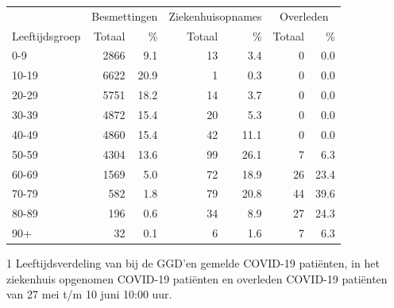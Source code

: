 \documentclass[
  english,
  man,floatsintext]{apa6}
\begin{document}
\begin{table}
\centering\begingroup\fontsize{11}{13}\selectfont

\begin{threeparttable}
\begin{tabular}{lrrrrrr}
\toprule
\multicolumn{1}{c}{ } & \multicolumn{2}{c}{Besmettingen} & \multicolumn{2}{c}{Ziekenhuisopnames} & \multicolumn{2}{c}{Overleden} \\
\cmidrule(l{3pt}r{3pt}){2-3} \cmidrule(l{3pt}r{3pt}){4-5} \cmidrule(l{3pt}r{3pt}){6-7}
Leeftijdsgroep & Totaal & \% & Totaal & \% & Totaal & \%\\
\midrule
0-9 & 2866 & 9.1 & 13 & 3.4 & 0 & 0.0\\
10-19 & 6622 & 20.9 & 1 & 0.3 & 0 & 0.0\\
20-29 & 5751 & 18.2 & 14 & 3.7 & 0 & 0.0\\
30-39 & 4872 & 15.4 & 20 & 5.3 & 0 & 0.0\\
40-49 & 4860 & 15.4 & 42 & 11.1 & 0 & 0.0\\
50-59 & 4304 & 13.6 & 99 & 26.1 & 7 & 6.3\\
60-69 & 1569 & 5.0 & 72 & 18.9 & 26 & 23.4\\
70-79 & 582 & 1.8 & 79 & 20.8 & 44 & 39.6\\
80-89 & 196 & 0.6 & 34 & 8.9 & 27 & 24.3\\
90+ & 32 & 0.1 & 6 & 1.6 & 7 & 6.3\\
\bottomrule
\end{tabular}
\begin{tablenotes}
\item[1] Leeftijdsverdeling van bij de GGD’en gemelde COVID-19 patiënten, in het ziekenhuis opgenomen COVID-19 patiënten en overleden COVID-19 patiënten van 27 mei t/m 10 juni 10:00 uur.
\end{tablenotes}
\end{threeparttable}
\endgroup{}
\end{table}

\newpage
\end{document}
